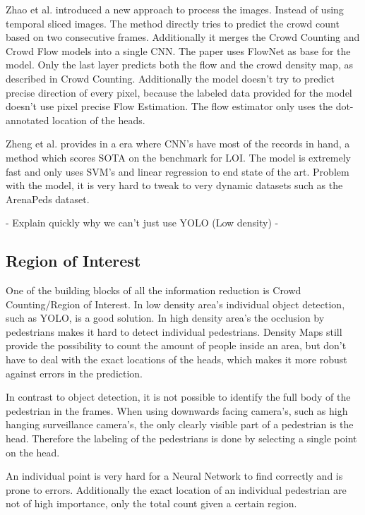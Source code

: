 Zhao et al. \cite{leibe_crossing-line_2016} introduced a new approach to process the images. Instead of using temporal sliced images. The method directly tries to predict the crowd count based on two consecutive frames. Additionally it merges the Crowd Counting and Crowd Flow models into a single CNN. The paper uses FlowNet as base for the model. Only the last layer predicts both the flow and the crowd density map, as described in Crowd Counting. Additionally the model doesn't try to predict precise direction of every pixel, because the labeled data provided for the model doesn't use pixel precise Flow Estimation. The flow estimator only uses the dot-annotated location of the heads.

Zheng et al. \cite{zheng_cross-line_2019} provides in a era where CNN's have most of the records in hand, a method which scores SOTA on the benchmark for LOI. The model is extremely fast and only uses SVM's and linear regression to end state of the art. Problem with the model, it is very hard to tweak to very dynamic datasets such as the ArenaPeds dataset.



- Explain quickly why we can't just use YOLO (Low density)
-

\subsection{Region of Interest}
One of the building blocks of all the information reduction is Crowd Counting/Region of Interest. In low density area's individual object detection, such as YOLO, is a good solution. In high density area's the occlusion by pedestrians makes it hard to detect individual pedestrians. Density Maps still provide the possibility to count the amount of people inside an area, but don't have to deal with the exact locations of the heads, which makes it more robust against errors in the prediction.

In contrast to object detection, it is not possible to identify the full body of the pedestrian in the frames. When using downwards facing camera's, such as high hanging surveillance camera's, the only clearly visible part of a pedestrian is the head. Therefore the labeling of the pedestrians is done by selecting a single point on the head.

An individual point is very hard for a Neural Network to find correctly and is prone to errors. Additionally the exact location of an individual pedestrian are not of high importance, only the total count given a certain region.

